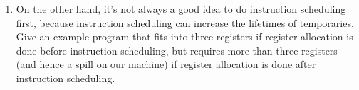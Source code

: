 \documentclass{article}
\begin{document}
\begin{enumerate}
\begin{enumerate}
\item On the other hand, it's not always a good idea to do instruction
scheduling first, because instruction scheduling can increase the
lifetimes of temporaries.  Give an example program that fits into
three registers if register allocation is done before instruction
scheduling, but requires more than three registers (and hence a spill
on our machine) if register allocation is done after instruction
scheduling.
\end{enumerate}


\end{enumerate}
\end{document}
